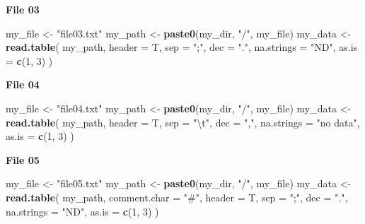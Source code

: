 \documentclass[]{book}
\newenvironment{Shaded}{\begin{snugshade}}{\end{snugshade}}
\newcommand{\CharTok}[1]{\textcolor[rgb]{0.31,0.60,0.02}{#1}}
\newcommand{\DataTypeTok}[1]{\textcolor[rgb]{0.13,0.29,0.53}{#1}}
\newcommand{\DecValTok}[1]{\textcolor[rgb]{0.00,0.00,0.81}{#1}}
\newcommand{\KeywordTok}[1]{\textcolor[rgb]{0.13,0.29,0.53}{\textbf{#1}}}
\newcommand{\NormalTok}[1]{#1}
\newcommand{\StringTok}[1]{\textcolor[rgb]{0.31,0.60,0.02}{#1}}
\begin{document}
\textbf{File 03}

\begin{Shaded}
\begin{Highlighting}[]
\NormalTok{my_file <-}\StringTok{ "file03.txt"}
\NormalTok{my_path <-}\StringTok{ }\KeywordTok{paste0}\NormalTok{(my_dir, }\StringTok{"/"}\NormalTok{, my_file)}
\NormalTok{my_data <-}\StringTok{ }\KeywordTok{read.table}\NormalTok{(}
\NormalTok{    my_path,}
    \DataTypeTok{header =}\NormalTok{ T,}
    \DataTypeTok{sep =} \StringTok{";"}\NormalTok{,}
    \DataTypeTok{dec =} \StringTok{"."}\NormalTok{,}
    \DataTypeTok{na.strings =} \StringTok{"ND"}\NormalTok{,}
    \DataTypeTok{as.is =} \KeywordTok{c}\NormalTok{(}\DecValTok{1}\NormalTok{, }\DecValTok{3}\NormalTok{)}
\NormalTok{)}
\end{Highlighting}
\end{Shaded}

\textbf{File 04}

\begin{Shaded}
\begin{Highlighting}[]
\NormalTok{my_file <-}\StringTok{ "file04.txt"}
\NormalTok{my_path <-}\StringTok{ }\KeywordTok{paste0}\NormalTok{(my_dir, }\StringTok{"/"}\NormalTok{, my_file)}
\NormalTok{my_data <-}\StringTok{ }\KeywordTok{read.table}\NormalTok{(}
\NormalTok{    my_path,}
    \DataTypeTok{header =}\NormalTok{ T,}
    \DataTypeTok{sep =} \StringTok{"}\CharTok{\textbackslash{}t}\StringTok{"}\NormalTok{,}
    \DataTypeTok{dec =} \StringTok{","}\NormalTok{,}
    \DataTypeTok{na.strings =} \StringTok{"no data"}\NormalTok{,}
    \DataTypeTok{as.is =} \KeywordTok{c}\NormalTok{(}\DecValTok{1}\NormalTok{, }\DecValTok{3}\NormalTok{)}
\NormalTok{)}
\end{Highlighting}
\end{Shaded}

\textbf{File 05}

\begin{Shaded}
\begin{Highlighting}[]
\NormalTok{my_file <-}\StringTok{ "file05.txt"}
\NormalTok{my_path <-}\StringTok{ }\KeywordTok{paste0}\NormalTok{(my_dir, }\StringTok{"/"}\NormalTok{, my_file)}
\NormalTok{my_data <-}\StringTok{ }\KeywordTok{read.table}\NormalTok{(}
\NormalTok{    my_path,}
    \DataTypeTok{comment.char =} \StringTok{"#"}\NormalTok{,}
    \DataTypeTok{header =}\NormalTok{ T,}
    \DataTypeTok{sep =} \StringTok{";"}\NormalTok{,}
    \DataTypeTok{dec =} \StringTok{"."}\NormalTok{,}
    \DataTypeTok{na.strings =} \StringTok{"ND"}\NormalTok{,}
    \DataTypeTok{as.is =} \KeywordTok{c}\NormalTok{(}\DecValTok{1}\NormalTok{, }\DecValTok{3}\NormalTok{)}
\NormalTok{)}
\end{Highlighting}
\end{Shaded}
\end{document}
